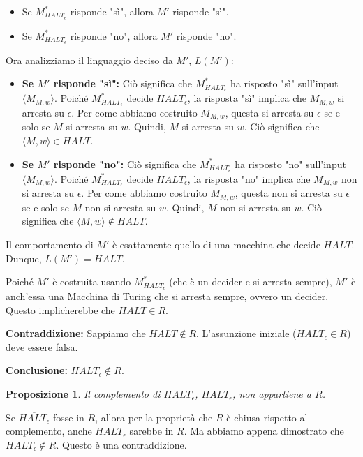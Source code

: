 \documentclass[a4paper]{article}
\makeatletter
\newtheorem{proposition}{Proposizione}[section]
\renewenvironment{proof}[1][\proofname]{\par
  \pushQED{\qed}%
  \normalfont \topsep6\p@\@plus6\p@\relax
  \trivlist
  \item[\hskip\labelsep
        \bfseries
    #1\@addpunct{.}]\ignorespaces
}{%
  \popQED\endtrivlist\@endpefalse
}
\makeatother
\begin{document}
\begin{proof}
\begin{enumerate}
\begin{enumerate}
        \begin{itemize}
            \item Se $M_{HALT_\epsilon}^*$ risponde "sì", allora $M'$ risponde "sì".
            \item Se $M_{HALT_\epsilon}^*$ risponde "no", allora $M'$ risponde "no".
        \end{itemize}
    \end{enumerate}
\end{enumerate}
Ora analizziamo il linguaggio deciso da $M'$, $L(M')$:
\begin{itemize}
    \item \textbf{Se $M'$ risponde "sì":}
    Ciò significa che $M_{HALT_\epsilon}^*$ ha risposto "sì" sull'input $\langle M_{M,w} \rangle$.
    Poiché $M_{HALT_\epsilon}^*$ decide $HALT_\epsilon$, la risposta "sì" implica che $M_{M,w}$ si arresta su $\epsilon$.
    Per come abbiamo costruito $M_{M,w}$, questa si arresta su $\epsilon$ se e solo se $M$ si arresta su $w$.
    Quindi, $M$ si arresta su $w$. Ciò significa che $\langle M, w \rangle \in HALT$.
    \item \textbf{Se $M'$ risponde "no":}
    Ciò significa che $M_{HALT_\epsilon}^*$ ha risposto "no" sull'input $\langle M_{M,w} \rangle$.
    Poiché $M_{HALT_\epsilon}^*$ decide $HALT_\epsilon$, la risposta "no" implica che $M_{M,w}$ non si arresta su $\epsilon$.
    Per come abbiamo costruito $M_{M,w}$, questa non si arresta su $\epsilon$ se e solo se $M$ non si arresta su $w$.
    Quindi, $M$ non si arresta su $w$. Ciò significa che $\langle M, w \rangle \notin HALT$.
\end{itemize}
Il comportamento di $M'$ è esattamente quello di una macchina che decide $HALT$. Dunque, $L(M') = HALT$.

Poiché $M'$ è costruita usando $M_{HALT_\epsilon}^*$ (che è un decider e si arresta sempre), $M'$ è anch'essa una Macchina di Turing che si arresta sempre, ovvero un decider.
Questo implicherebbe che $HALT \in R$.

\textbf{Contraddizione:} Sappiamo che $HALT \notin R$.
L'assunzione iniziale ($HALT_\epsilon \in R$) deve essere falsa.

\textbf{Conclusione:} $HALT_\epsilon \notin R$.
\end{proof}

\begin{proposition}
Il complemento di $HALT_\epsilon$, $\overline{HALT_\epsilon}$, non appartiene a $R$.
\end{proposition}
\begin{proof}
Se $\overline{HALT_\epsilon}$ fosse in $R$, allora per la proprietà che $R$ è chiusa rispetto al complemento, anche $HALT_\epsilon$ sarebbe in $R$. Ma abbiamo appena dimostrato che $HALT_\epsilon \notin R$. Questo è una contraddizione.
\end{proof}
\end{document}
